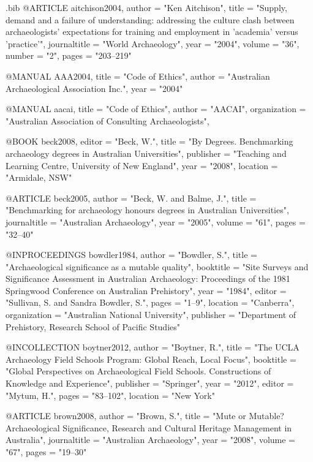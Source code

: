 \begin{filecontents}{\IJSRAidentifier.bib}
	@ARTICLE {aitchison2004,
		author  = "Ken Aitchison",
		title   = "Supply, demand and a failure of understanding: addressing the culture clash between archaeologists' expectations for training and employment in 'academia' versus 'practice'",
		journaltitle = "World Archaeology",
		year    = "2004",
		volume  = "36",
		number  = "2",
		pages   = "203--219"
	}
	
	
	@MANUAL {AAA2004,
		title  = "Code of Ethics",
		author = "Australian Archaeological Association Inc.",
		year   = "2004"
	}
	
	
	@MANUAL {aacai,
		title        = "Code of Ethics",
		author       = "AACAI",
		organization = "Australian Association of Consulting Archaeologists",
	}
	
	
	@BOOK {beck2008,
		editor    = "Beck, W.",
		title     = "By Degrees. Benchmarking archaeology degrees in Australian Universities",
		publisher = "Teaching and Learning Centre, University of New England",
		year      = "2008",
		location   = "Armidale, NSW"
	}
	
	
	@ARTICLE {beck2005,
		author  = "Beck, W. and Balme, J.",
		title   = "Benchmarking for archaeology honours degrees in Australian Universities",
		journaltitle = "Australian Archaeology",
		year    = "2005",
		volume  = "61",
		pages   = "32--40"
	}
	
	
	@INPROCEEDINGS {bowdler1984,
		author       = "Bowdler, S.",
		title        = "Archaeological significance as a mutable quality",
		booktitle    = "Site Surveys and Significance Assessment in Australian Archaeology: Proceedings of the 1981 Springwood Conference on Australian Prehistory",
		year         = "1984",
		editor       = "Sullivan, S. and Sandra Bowdler, S.",
		pages        = "1--9",
		location      = "Canberra",
		organization = "Australian National University",
		publisher    = "Department of Prehistory, Research School of Pacific Studies"
	}
	
	
	@INCOLLECTION {boytner2012,
		author    = "Boytner, R.",
		title     = "The UCLA Archaeology Field Schools Program: Global Reach, Local Focus",
		booktitle = "Global Perspectives on Archaeological Field Schools. Constructions of Knowledge and Experience",
		publisher = "Springer",
		year      = "2012",
		editor    = "Mytum, H.",
		pages     = "83--102",
		location   = "New York"
	}
	
	
	@ARTICLE {brown2008,
		author  = "Brown, S.",
		title   = "Mute or Mutable? Archaeological Significance, Research and Cultural Heritage Management in Australia",
		journaltitle = "Australian Archaeology",
		year    = "2008",
		volume  = "67",
		pages   = "19--30"
	}
	

\end{filecontents}
